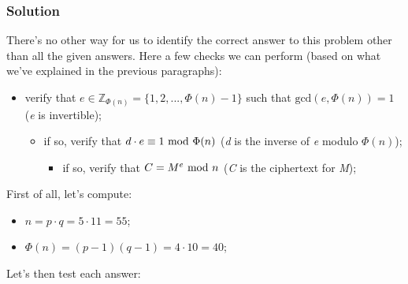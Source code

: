\subsubsection*{Solution}
There's no other way for us to identify the correct answer to this problem other than  all the given answers. Here a few checks we can perform (based on what we've explained in the previous paragraphs):
\begin{itemize}
    \item verify that $e\in\mathbb{Z}_{\Phi(n)}=\{1,2,...,\Phi(n)-1\}$ such that $\text{gcd}(e,\Phi(n))=1$ (\textit{e} is invertible);
    \begin{itemize}
        \item if so, verify that $d\cdot e\equiv1\text{ mod }\Phi(n)$ (\textit{d} is the inverse of \textit{e} modulo $\Phi(n)$);
        \begin{itemize}
            \item if so, verify that $C=M^e\text{ mod } n$ (\textit{C} is the ciphertext for \textit{M});
        \end{itemize}
    \end{itemize}
\end{itemize}
First of all, let's compute:
\begin{itemize}
    \item $n=p\cdot q=5\cdot11=55$;
    \item $\Phi(n)=(p-1)(q-1)=4\cdot10=40$;
\end{itemize}
Let's then test each answer:
